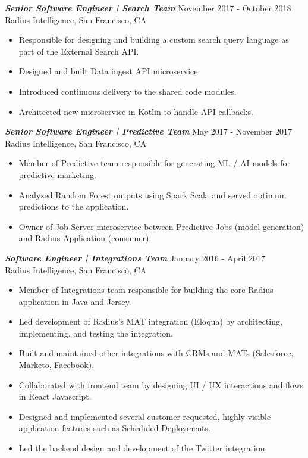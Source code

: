 \documentclass[overlapped, 10pt]{res} %
\begin{document}
\begin{resume}
{\sl \textbf{Senior Software Engineer | Search Team}} \hfill November 2017 - October 2018 \\
Radius Intelligence, San Francisco, CA
\begin{itemize} \itemsep -1pt %
\item Responsible for designing and building a custom search query language as part of the External Search API.
\item Designed and built Data ingest API microservice.
\item Introduced continuous delivery to the shared code modules.
\item Architected new microservice in Kotlin to handle API callbacks.
\end{itemize} 

{\sl \textbf{Senior Software Engineer | Predictive Team}} \hfill May 2017 - November 2017 \\
Radius Intelligence, San Francisco, CA
\begin{itemize} \itemsep -1pt %
\item Member of Predictive team responsible for generating ML / AI models for predictive marketing.
\item Analyzed Random Forest outputs using Spark Scala and served optimum predictions to the application.
\item Owner of Job Server microservice between Predictive Jobs (model generation) and Radius Application (consumer).
\end{itemize} 

{\sl \textbf{Software Engineer | Integrations Team}} \hfill January 2016 - April 2017 \\
Radius Intelligence, San Francisco, CA
\begin{itemize} \itemsep -1pt %
\item Member of Integrations team responsible for building the core Radius application in Java and Jersey.
\item Led development of Radius’s MAT integration (Eloqua) by architecting, implementing, and testing the integration.
\item Built and maintained other integrations with CRMs and MATs (Salesforce, Marketo, Facebook).
\item Collaborated with frontend team by designing UI / UX interactions and flows in React Javascript.
\item Designed and implemented several customer requested, highly visible application features such as Scheduled Deployments.
\item Led the backend design and development of the Twitter integration.
\end{itemize}
 

\end{resume}
\end{document}

